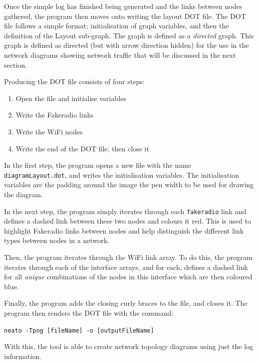 Once the simple log has finished being generated and the links between nodes gathered, the program then moves onto writing the layout DOT file.
The DOT file follows a simple format; initialisation of graph variables, and then the definition of the Layout sub-graph.
The graph is defined as a \emph{directed} graph.
This graph is defined as directed (but with arrow direction hidden) for the use in the network diagrams showing network traffic that will be discussed in the next section.

Producing the DOT file consists of four steps:
\begin{enumerate}
    \item Open the file and initialise variables
    \item Write the Fakeradio links
    \item Write the WiFi nodes
    \item Write the end of the DOT file, then close it
\end{enumerate}

In the first step, the program opens a new file with the name \texttt{diagramLayout.dot}, and writes the initialisation variables.
The initialisation variables are the padding around the image the pen width to be used for drawing the diagram.

In the next step, the program simply iterates through each \texttt{fakeradio} link and defines a dashed link between these two nodes and colours it red.
This is used to highlight Fakeradio links between nodes and help distinguish the different link types between nodes in a network.


Then, the program iterates through the WiFi link array. 
To do this, the program iterates through each of the interface arrays, and for each, defines a dashed link for all \emph{unique} combinations of the nodes in this interface which are then coloured blue.

Finally, the program adds the closing curly braces to the file, and closes it.
The program then renders the DOT file with the command:

\texttt{neato -Tpng [fileName] -o [outputFileName]}

With this, the tool is able to create network topology diagrams using just the log information.

